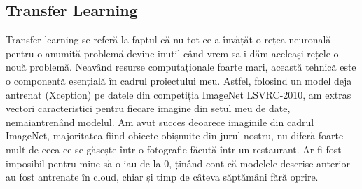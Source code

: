 \subsection{Transfer Learning}
Transfer learning se referă la faptul că nu tot ce a învățăt o rețea neuronală pentru o anumită problemă devine inutil când vrem să-i dăm aceleași rețele o nouă problemă. Neavând resurse computaționale foarte mari, această tehnică este o componentă esențială în cadrul proiectului meu. Astfel, folosind un model deja antrenat (Xception) pe datele din competiția ImageNet LSVRC-2010, am extras vectori caracteristici pentru fiecare imagine din setul meu de date, nemaiantrenând modelul. Am avut succes deoarece imaginile din cadrul ImageNet, majoritatea fiind obiecte obișnuite din jurul nostru, nu diferă foarte mult de ceea ce se găsește într-o fotografie făcută într-un restaurant. Ar fi fost imposibil pentru mine să o iau de la 0, ținând cont că modelele descrise anterior au fost antrenate în cloud, chiar și timp de câteva săptămâni fără oprire.